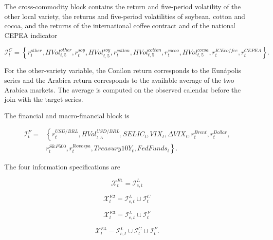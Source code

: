 \documentclass[a4paper,fleqn]{cas-sc}
\begin{document}
The cross-commodity block contains the return and five-period volatility of the other local variety, the returns and five-period volatilities of soybean, cotton and cocoa, and the returns of the international coffee contract and of the national CEPEA indicator

\begin{equation}
\mathcal{I}^{C}_{t}
=
\left\{
r^{other}_{t},HVol^{other}_{t,5},
r^{soy}_{t},HVol^{soy}_{t,5},
r^{cotton}_{t},HVol^{cotton}_{t,5},
r^{cocoa}_{t},HVol^{cocoa}_{t,5},
r^{ICEcoffee}_{t},r^{CEPEA}_{t}
\right\}.
\label{eq:cross_info}
\end{equation}

For the other-variety variable, the Conilon return corresponds to the Eunápolis series and the Arabica return corresponds to the available average of the two Arabica markets. The average is computed on the observed calendar before the join with the target series.

The financial and macro-financial block is

\begin{equation}
\begin{aligned}
\mathcal{I}^{F}_{t}
={}&\left\{
r^{USD/BRL}_{t},HVol^{USD/BRL}_{t,5},
SELIC_{t},VIX_{t},\Delta VIX_{t},
r^{Brent}_{t},r^{Dollar}_{t}, \right.\\
&\left. r^{S\&P500}_{t},r^{Ibovespa}_{t},
Treasury10Y_{t},FedFunds_{t}
\right\}.
\end{aligned}
\label{eq:financial_info}
\end{equation}

The four information specifications are

\begin{equation}
\mathcal{X}^{E1}_{t}=\mathcal{I}^{L}_{c,t}
\label{eq:e1}
\end{equation}

\begin{equation}
\mathcal{X}^{E2}_{t}=\mathcal{I}^{L}_{c,t}\cup\mathcal{I}^{C}_{t}
\label{eq:e2}
\end{equation}

\begin{equation}
\mathcal{X}^{E3}_{t}=\mathcal{I}^{L}_{c,t}\cup\mathcal{I}^{F}_{t}
\label{eq:e3}
\end{equation}

\begin{equation}
\mathcal{X}^{E4}_{t}=\mathcal{I}^{L}_{c,t}\cup\mathcal{I}^{C}_{t}\cup\mathcal{I}^{F}_{t}.
\label{eq:e4}
\end{equation}
\end{document}
